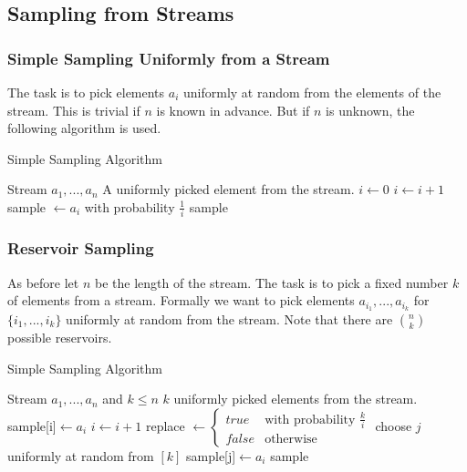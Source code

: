 \documentclass[english]{panikzettel}
\begin{document}
\subsection{Sampling from Streams}
\subsubsection{Simple Sampling Uniformly from a Stream}
The task is to pick elements $a_i$ uniformly at random from the elements of the stream. This is trivial if $n$ is known in advance. But if $n$ is unknown, the following algorithm is used.

\begin{algo}{Simple Sampling Algorithm}
{
\renewcommand{\algorithmicrequire}{\textbf{Input:}}
\renewcommand{\algorithmicensure}{\textbf{Output:}}
  \begin{algorithmic}[1]
  \Require Stream $a_1,...,a_n$ 
  \Ensure A uniformly picked element from the stream.
  \State $i\leftarrow 0$
    \State $i\leftarrow i+1$
    \State sample $\leftarrow a_i$ with probability $\frac{1}{i}$ 
  \EndWhile
  \State \Return sample
  \end{algorithmic}
}
\end{algo}

\subsubsection{Reservoir Sampling}
As before let $n$ be the length of the stream. The task is to pick a fixed number $k$ of elements from a stream. Formally we want to pick elements $a_{i_1},...,a_{i_k}$ for $\{i_1,...,i_k\}$ uniformly at random from the stream.
Note that there are $\binom{n}{k}$ possible reservoirs.

\begin{algo}{Simple Sampling Algorithm}
{
\renewcommand{\algorithmicrequire}{\textbf{Input:}}
\renewcommand{\algorithmicensure}{\textbf{Output:}}
  \begin{algorithmic}[1]
  \Require Stream $a_1,...,a_n$ and $k\leq n$
  \Ensure $k$ uniformly picked elements from the stream.
  \State sample[i]$\leftarrow a_i$ 
  \EndFor
    \State $i\leftarrow i+1$
    \State replace $\leftarrow\begin{cases}
    true & \text{with probability } \frac{k}{i}\\
    false & \text{otherwise}
    \end{cases}$
    \State choose $j$ uniformly at random from $[k]$
    \State sample[j]$\leftarrow a_i$
    \EndIf
  \EndWhile
  \State \Return sample
  \end{algorithmic}
}
\end{algo}
\end{document}
